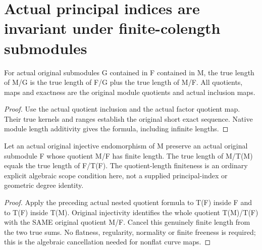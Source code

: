 \section{Actual principal indices are invariant under finite-colength submodules}

\begin{theorem}
\label{thm:fc-nested-quotient-length}
\leanok
{}
For actual original submodules G contained in F contained in M,
the true length of M/G is the true length of F/G plus the true
length of M/F. All quotients, maps and exactness are the original
module quotients and actual inclusion maps.
\end{theorem}
\begin{proof}
Use the actual quotient inclusion and the actual factor quotient
map. Their true kernels and ranges establish the original short
exact sequence. Native module length additivity gives the formula,
including infinite lengths.
\end{proof}

\begin{theorem}
\label{thm:fc-finite-colength-endomorphism-index}
\leanok
{}
Let an actual original injective endomorphism of M preserve an
actual original submodule F whose quotient M/F has finite length.
The true length of M/T(M) equals the true length of F/T(F).
The quotient-length finiteness is an ordinary explicit algebraic
scope condition here, not a supplied principal-index or geometric
degree identity.
\end{theorem}
\begin{proof}
Apply the preceding actual nested quotient formula to T(F) inside
F and to T(F) inside T(M). Original injectivity identifies the
whole quotient T(M)/T(F) with the SAME original quotient M/F.
Cancel this genuinely finite length from the two true sums. No
flatness, regularity, normality or finite freeness is required;
this is the algebraic cancellation needed for nonflat curve maps.
\end{proof}
